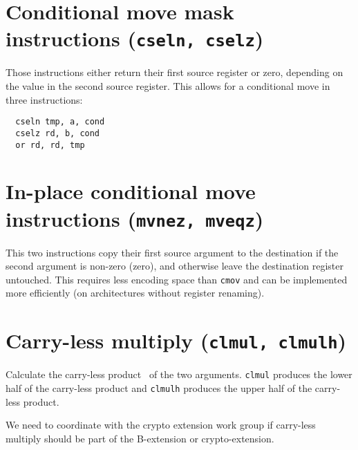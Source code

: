 
\section{Conditional move mask instructions (\texttt{cseln, cselz})}

Those instructions either return their first source register or zero, depending on the
value in the second source register. This allows for a conditional move in three instructions:

\begin{verbatim}
  cseln tmp, a, cond
  cselz rd, b, cond
  or rd, rd, tmp
\end{verbatim}




\section{In-place conditional move instructions (\texttt{mvnez, mveqz})}

This two instructions copy their first source argument to the destination if the second
argument is non-zero (zero), and otherwise leave the destination register untouched.
This requires less encoding space than \texttt{cmov} and can be implemented more
efficiently (on architectures without register renaming).


\section{Carry-less multiply (\texttt{clmul, clmulh})}

Calculate the carry-less product~\cite{CarryLessProduct} of the two arguments. \texttt{clmul}
produces the lower half of the carry-less product and \texttt{clmulh} produces the upper half
of the carry-less product.

We need to coordinate with the crypto extension work group if carry-less multiply should
be part of the B-extension or crypto-extension.


